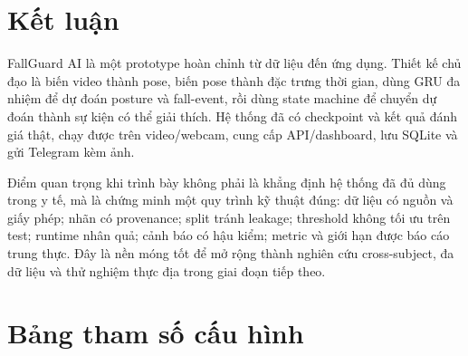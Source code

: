 \documentclass[12pt,a4paper,oneside]{report}
\begin{document}
\chapter{Kết luận}

FallGuard AI là một prototype hoàn chỉnh từ dữ liệu đến ứng dụng. Thiết kế chủ
đạo là biến video thành pose, biến pose thành đặc trưng thời gian, dùng GRU đa
nhiệm để dự đoán posture và fall-event, rồi dùng state machine để chuyển dự đoán
thành sự kiện có thể giải thích. Hệ thống đã có checkpoint và kết quả đánh giá
thật, chạy được trên video/webcam, cung cấp API/dashboard, lưu SQLite và gửi
Telegram kèm ảnh.

Điểm quan trọng khi trình bày không phải là khẳng định hệ thống đã đủ dùng trong
y tế, mà là chứng minh một quy trình kỹ thuật đúng: dữ liệu có nguồn và giấy
phép; nhãn có provenance; split tránh leakage; threshold không tối ưu trên test;
runtime nhân quả; cảnh báo có hậu kiểm; metric và giới hạn được báo cáo trung
thực. Đây là nền móng tốt để mở rộng thành nghiên cứu cross-subject, đa dữ liệu
và thử nghiệm thực địa trong giai đoạn tiếp theo.

\appendix
\chapter{Bảng tham số cấu hình}
\end{document}
